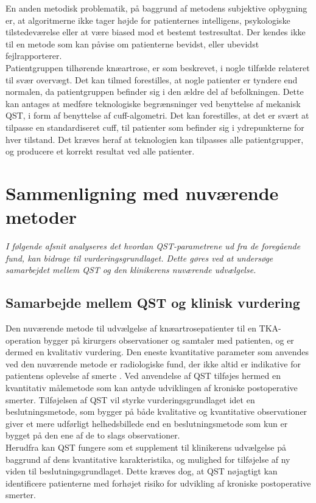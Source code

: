 En anden metodisk problematik, på baggrund af metodens subjektive opbygning er, at algoritmerne ikke tager højde for patienternes intelligens, psykologiske tilstedeværelse eller at være biased mod et bestemt testresultat. Der kendes ikke til en metode som kan påvise om patienterne bevidst, eller ubevidst fejlrapporterer. \citep{Dyck1998}  \\ 
Patientgruppen tilhørende knæartrose, er som beskrevet, i nogle tilfælde relateret til svær overvægt. Det kan tilmed forestilles, at nogle patienter er tyndere end normalen, da patientgruppen befinder sig i den ældre del af befolkningen. Dette kan antages at medføre teknologiske begrænsninger ved benyttelse af mekanisk QST, i form af benyttelse af cuff-algometri. Det kan forestilles, at det er svært at tilpasse en standardiseret cuff, til patienter som befinder sig i ydrepunkterne for hver tilstand. Det kræves heraf at teknologien kan tilpasses alle patientgrupper, og producere et korrekt resultat ved alle patienter. 
\section{Sammenligning med nuværende metoder}
\textit{I følgende afsnit analyseres det hvordan QST-parametrene ud fra de foregående fund, kan bidrage til vurderingsgrundlaget. Dette gøres ved at undersøge samarbejdet mellem QST og den klinikerens nuværende udvælgelse.}

\subsection{Samarbejde mellem QST og klinisk vurdering} %
Den nuværende metode til udvælgelse af knæartrosepatienter til en TKA-operation bygger på kirurgers observationer og samtaler med patienten, og er dermed en kvalitativ vurdering. \citep{Troelsen2012} \citep{skou2016} Den eneste kvantitative parameter som anvendes ved den nuværende metode er radiologiske fund, der ikke altid er indikative for patientens oplevelse af smerte \citep{Leary2016}. Ved anvendelse af QST tilføjes hermed en kvantitativ målemetode som kan antyde udviklingen af kroniske postoperative smerter. Tilføjelsen af QST vil styrke vurderingsgrundlaget idet en beslutningsmetode, som bygger på både kvalitative og kvantitative observationer giver et mere udførligt helhedsbillede end en beslutningsmetode som kun er bygget på den ene af de to slags observationer. \citep{Gronmo2012} \\
Herudfra kan QST fungere som et supplement til klinikerens udvælgelse på baggrund af dens kvantitative karakteristika, og mulighed for tilføjelse af ny viden til beslutningsgrundlaget. Dette kræves dog, at QST nøjagtigt kan identificere patienterne med forhøjet risiko for udvikling af kroniske postoperative smerter.   

